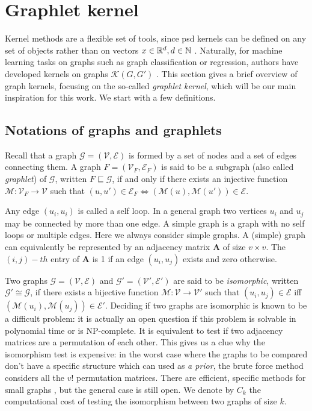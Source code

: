 \section{Graphlet kernel}
Kernel methods are a flexible set of tools, since psd kernels can be defined on any set of objects rather than on vectors $x\in \mathbb{R}^d, d\in \mathbb{N}$ . Naturally, for machine learning tasks on graphs such as graph classification or regression, authors have developed kernels on graphs $\mathcal{K}(G,G')$  \citep{kriege_graph_kernels}. This section gives a brief overview of graph kernels, focusing on the so-called \emph{graphlet kernel}, which will be our main inspiration for this work. We start with a few definitions.
\subsection{Notations of graphs and graphlets}
Recall that a graph $\mathcal{G} = (\mathcal{V}, \mathcal{E})$ is formed by a set of nodes and a set of edges connecting them. A graph $F=(\mathcal{V}_F,\mathcal{E}_F)$ is said to be a subgraph (also called \emph{graphlet}) of $\mathcal{G}$, written $F\sqsubseteq \mathcal{G}$, if and only if there exists an injective function $\mathcal{M}:\mathcal{V}_F\xrightarrow{} \mathcal{V}$ such that $(u,u')\in \mathcal{E}_F \Leftrightarrow{(\mathcal{M}(u),\mathcal{M}(u'))\in \mathcal{E}}$.

Any edge $(u_i, u_i)$ is called a self loop. In a general graph two vertices $u_i$ and $u_j$ may be connected by more than
one edge. A simple graph is a graph with no self loops or multiple edges. Here we always consider simple graphs.
A (simple) graph can equivalently be represented by an adjacency matrix $\mathbf{A}$ of size $v \times v$. The $(i,j)-th$ entry of $\mathbf{A}$ is 1 if an edge $(u_i, u_j)$ exists and zero otherwise.

Two graphs $\mathcal{G}=(\mathcal{V},\mathcal{E})$ and $\mathcal{G'}=(\mathcal{V'},\mathcal{E'})$ are said to be \emph{isomorphic}, written $\mathcal{G}'\cong \mathcal{G}$, if there exists a bijective function $\mathcal{M}:\mathcal{V}\xrightarrow{} \mathcal{V}'$ such that $(u_i,u_j)\in \mathcal{E}$ iff $(\mathcal{M}(u_i),\mathcal{M}(u_j))\in \mathcal{E}'$. Deciding if two graphs are isomorphic is known to be a difficult problem: it is actually an open question if this problem is solvable in polynomial time or is NP-complete. It is equivalent to test if two adjacency matrices are a permutation of each other. This gives us a clue why the isomorphism test is expensive: in the worst case where the graphs to be compared don't have a specific structure which can used as \emph{a prior}, the brute force method considers all the $v!$ permutation matrices. There are efficient, specific methods for small graphs \citep{graphlet_kernel}, but the general case is still open. We denote by $C_k$ the computational cost of testing the isomorphism between two graphs of size $k$. 

